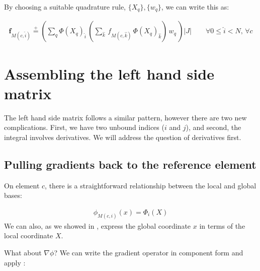 \documentclass{book}
\begin{document}
By choosing a suitable quadrature rule, \(\{X_q\}, \{w_q\}\), we can
write this as:

\label{\detokenize{6_finite_element_problems:equation-rhs_index}}\begin{equation}\label{equation:6_finite_element_problems:rhs_index}
\begin{split}\mathbf{f}_{M(c, \hat{i})} \stackrel{+}{=} \left(\sum_q \Phi(X_q)_{\hat{i}}\, \left(\sum_{\hat{k}}\,f_{M(c,\hat{k})}\,\Phi(X_q)_{\hat{k}}\right)\,w_q\,\right) |J| \qquad \forall 0 \leq \hat{i} < N,\, \forall c\end{split}
\end{equation}

\section{Assembling the left hand side matrix}
\label{\detokenize{6_finite_element_problems:assembling-the-left-hand-side-matrix}}
The left hand side matrix follows a similar pattern, however there are
two new complications. First, we have two unbound indices (\(i\) and
\(j\)), and second, the integral involves derivatives. We will address
the question of derivatives first.


\subsection{Pulling gradients back to the reference element}
\label{\detokenize{6_finite_element_problems:pulling-gradients-back-to-the-reference-element}}
On element \(c\), there is a straightforward relationship between the
local and global bases:

\label{\detokenize{6_finite_element_problems:equation-pullback}}\begin{equation}\label{equation:6_finite_element_problems:pullback}
\begin{split}\phi_{M(c,i)}(x) = \Phi_i(X)\end{split}
\end{equation}
We can also, as we showed in {\hyperref[\detokenize{5_functions:coordinates}]{}}, express the global
coordinate \(x\) in terms of the local coordinate \(X\).

What about \(\nabla\phi\)? We can write the gradient operator in
component form and apply {\hyperref[\detokenize{6_finite_element_problems:equation-pullback}]{}}:
\end{document}

